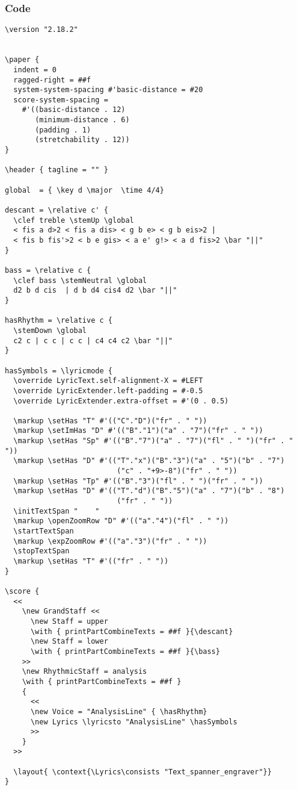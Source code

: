 \documentclass[
  DIV=calc,
  BCOR=5mm,
  12pt,
  headings=small,
  oneside,
  abstract=true,
  toc=bib,
  xcolor=dvipsnames,
  openany,
  ngerman,english]{scrartcl}
\begin{document}
\subsubsection{Code}
\begin{scriptsize}
\begin{verbatim}
\version "2.18.2"


\paper {
  indent = 0
  ragged-right = ##f
  system-system-spacing #'basic-distance = #20
  score-system-spacing =
    #'((basic-distance . 12)
       (minimum-distance . 6)
       (padding . 1)
       (stretchability . 12))
}

\header { tagline = "" }

global  = { \key d \major  \time 4/4}

descant = \relative c' {
  \clef treble \stemUp \global
  < fis a d>2 < fis a dis> < g b e> < g b eis>2 | 
  < fis b fis'>2 < b e gis> < a e' g!> < a d fis>2 \bar "||"
}

bass = \relative c {
  \clef bass \stemNeutral \global
  d2 b d cis  | d b d4 cis4 d2 \bar "||"
}

hasRhythm = \relative c {
  \stemDown \global
  c2 c | c c | c c | c4 c4 c2 \bar "||"
}

hasSymbols = \lyricmode {
  \override LyricText.self-alignment-X = #LEFT
  \override LyricExtender.left-padding = #-0.5
  \override LyricExtender.extra-offset = #'(0 . 0.5)

  \markup \setHas "T" #'(("C"."D")("fr" . " "))
  \markup \setImHas "D" #'(("B"."1")("a" . "7")("fr" . " "))
  \markup \setHas "Sp" #'(("B"."7")("a" . "7")("fl" . " ")("fr" . " "))
  \markup \setHas "D" #'(("T"."x")("B"."3")("a" . "5")("b" . "7")
                          ("c" . "+9>-8")("fr" . " "))
  \markup \setHas "Tp" #'(("B"."3")("fl" . " ")("fr" . " ")) 
  \markup \setHas "D" #'(("T"."d")("B"."5")("a" . "7")("b" . "8")
                          ("fr" . " "))    
  \initTextSpan "    "
  \markup \openZoomRow "D" #'(("a"."4")("fl" . " "))
  \startTextSpan
  \markup \expZoomRow #'(("a"."3")("fr" . " ")) 
  \stopTextSpan
  \markup \setHas "T" #'(("fr" . " "))
}

\score {
  <<
    \new GrandStaff <<
      \new Staff = upper
      \with { printPartCombineTexts = ##f }{\descant}
      \new Staff = lower
      \with { printPartCombineTexts = ##f }{\bass}
    >>
    \new RhythmicStaff = analysis
    \with { printPartCombineTexts = ##f }
    {
      << 
      \new Voice = "AnalysisLine" { \hasRhythm}
      \new Lyrics \lyricsto "AnalysisLine" \hasSymbols
      >>
    }
  >>

  \layout{ \context{\Lyrics\consists "Text_spanner_engraver"}}
} 

\end{verbatim}
\end{scriptsize}
\end{document}
